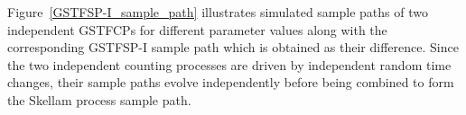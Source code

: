 \documentclass[11pt,oneside,reqno]{amsart}
\theoremstyle{definition}
\theoremstyle{remarkstyle}
\begin{document}



Figure~\ref{GSTFSP-I_sample_path} illustrates simulated sample paths of two independent GSTFCPs for different parameter values along with the corresponding GSTFSP-I sample path which is obtained as their difference. 
Since the two independent counting processes are driven by independent random time changes, their sample paths evolve independently before being combined to form the Skellam process sample path. 
\end{document}
